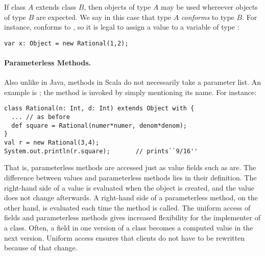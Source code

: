 \documentclass[11pt]{report}
\begin{document}
If class $A$ extends class $B$, then objects of type $A$ may be used
whereever objects of type $B$ are expected. We say in this case that
type $A$ {\em conforms} to type $B$.  For instance, \verb@Rational@
conforms to \verb@Object@, so it is legal to assign a \verb@Rational@
value to a variable of type \verb@Object@:
\begin{verbatim}
var x: Object = new Rational(1,2);
\end{verbatim}

\paragraph{Parameterless Methods.}
Also unlike in Java, methods in Scala do not necessarily take a
parameter list. An example is \verb@square@; the method is invoked by
simply mentioning its name. For instance:
\begin{verbatim}
class Rational(n: Int, d: Int) extends Object with {
  ... // as before
  def square = Rational(numer*numer, denom*denom);
}
val r = new Rational(3,4);
System.out.println(r.square);		// prints``9/16''
\end{verbatim}
That is, parameterless methods are accessed just as value fields such
as \verb@numer@ are. The difference between values and parameterless
methods lies in their definition. The right-hand side of a value is
evaluated when the object is created, and the value does not change
afterwards. A right-hand side of a parameterless method, on the other
hand, is evaluated each time the method is called.  The uniform access
of fields and parameterless methods gives increased flexibility for
the implementer of a class. Often, a field in one version of a class
becomes a computed value in the next version. Uniform access ensures
that clients do not have to be rewritten because of that change.
\end{document}
